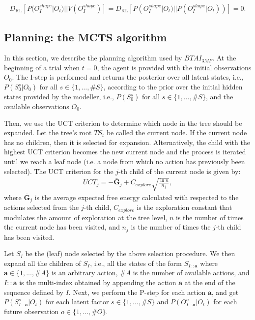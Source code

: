 \documentclass[twoside,11pt]{article}
\newcommand{\nb}[1]{\# #1}
\begin{document}
\begin{align*}
D_{\mathrm{KL}}[P(O_I^{shape}|O_t)||V(O_I^{shape})] = D_{\mathrm{KL}}[P(O_I^{shape}|O_t)||P(O_I^{shape}|O_t))] = 0.
\end{align*}

\subsection{Planning: the MCTS algorithm} \label{ssec:planning}

In this section, we describe the planning algorithm used by $BTAI_{3MF}$. At the beginning of a trial when $t = 0$, the agent is provided with the initial observations $O_0$. The I-step is performed and returns the posterior over all latent states, i.e., $P(S_0^s|O_0)$ for all $s \in \{1, \hdots, \nb{S}\}$, according to the prior over the initial hidden states provided by the modeller, i.e., $P(S_0^s)$ for all $s \in \{1, \hdots, \nb{S}\}$, and the available observations $O_0$. 

Then, we use the UCT criterion to determine which node in the tree should be expanded. Let the tree's root $TS_t$ be called the current node. If the current node has no children, then it is selected for expansion. Alternatively, the child with the highest UCT criterion becomes the new current node and the process is iterated until we reach a leaf node (i.e. a node from which no action has previously been selected). The UCT criterion \citep{MCTS} for the $j$-th child of the current node is given by:
\begin{align}\label{eq:UCT}
UCT_j = - \bar{\bm{G}}_j + C_{explore} \sqrt{\frac{\ln n}{n_j}},
\end{align}
where $\bar{\bm{G}}_j$ is the average expected free energy calculated with respected to the actions selected from the $j$-th child, $C_{explore}$ is the exploration constant that modulates the amount of exploration at the tree level, $n$ is the number of times the current node has been visited, and $n_j$ is the number of times the $j$-th child has been visited. 

Let $S_I$ be the (leaf) node selected by the above selection procedure. We then expand all the children of $S_I$, i.e., all the states of the form $S_{I::\bm{a}}$ where $\bm{a} \in \{1, ..., \nb{A}\}$ is an arbitrary action, $\nb{A}$ is the number of available actions, and $I::\bm{a}$ is the multi-index obtained by appending the action $\bm{a}$ at the end of the sequence defined by $I$. Next, we perform the P-step for each action $\bm{a}$, and get $P(S_{I::\bm{a}}^s|O_t)$ for each latent factor $s \in \{1, \hdots, \nb{S}\}$ and $P(O_{I::\bm{a}}^o|O_t)$ for each future observation $o \in \{1, \hdots, \nb{O}\}$.
\end{document}
